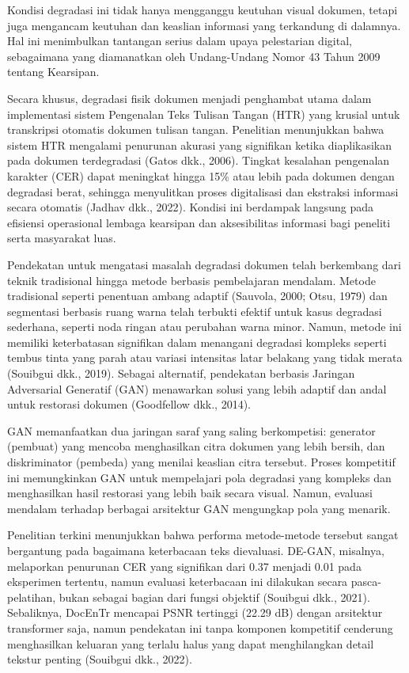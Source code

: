 \documentclass[12pt,a4paper]{book}
\begin{document}
\vspace{0.8em}
Kondisi degradasi ini tidak hanya mengganggu keutuhan visual dokumen, tetapi juga mengancam keutuhan dan keaslian informasi yang terkandung di dalamnya. Hal ini menimbulkan tantangan serius dalam upaya pelestarian digital, sebagaimana yang diamanatkan oleh Undang-Undang Nomor 43 Tahun 2009 tentang Kearsipan.

\vspace{0.8em}
Secara khusus, degradasi fisik dokumen menjadi penghambat utama dalam implementasi sistem Pengenalan Teks Tulisan Tangan (HTR) yang krusial untuk transkripsi otomatis dokumen tulisan tangan. Penelitian menunjukkan bahwa sistem HTR mengalami penurunan akurasi yang signifikan ketika diaplikasikan pada dokumen terdegradasi (Gatos dkk., 2006). Tingkat kesalahan pengenalan karakter (CER) dapat meningkat hingga 15\% atau lebih pada dokumen dengan degradasi berat, sehingga menyulitkan proses digitalisasi dan ekstraksi informasi secara otomatis (Jadhav dkk., 2022). Kondisi ini berdampak langsung pada efisiensi operasional lembaga kearsipan dan aksesibilitas informasi bagi peneliti serta masyarakat luas.

\vspace{0.8em}
Pendekatan untuk mengatasi masalah degradasi dokumen telah berkembang dari teknik tradisional hingga metode berbasis pembelajaran mendalam. Metode tradisional seperti penentuan ambang adaptif (Sauvola, 2000; Otsu, 1979) dan segmentasi berbasis ruang warna telah terbukti efektif untuk kasus degradasi sederhana, seperti noda ringan atau perubahan warna minor. Namun, metode ini memiliki keterbatasan signifikan dalam menangani degradasi kompleks seperti tembus tinta yang parah atau variasi intensitas latar belakang yang tidak merata (Souibgui dkk., 2019). Sebagai alternatif, pendekatan berbasis Jaringan Adversarial Generatif (GAN) menawarkan solusi yang lebih adaptif dan andal untuk restorasi dokumen (Goodfellow dkk., 2014).

\vspace{0.8em}
GAN memanfaatkan dua jaringan saraf yang saling berkompetisi: generator (pembuat) yang mencoba menghasilkan citra dokumen yang lebih bersih, dan diskriminator (pembeda) yang menilai keaslian citra tersebut. Proses kompetitif ini memungkinkan GAN untuk mempelajari pola degradasi yang kompleks dan menghasilkan hasil restorasi yang lebih baik secara visual. Namun, evaluasi mendalam terhadap berbagai arsitektur GAN mengungkap pola yang menarik.

\vspace{0.8em}
Penelitian terkini menunjukkan bahwa performa metode-metode tersebut sangat bergantung pada bagaimana keterbacaan teks dievaluasi. DE-GAN, misalnya, melaporkan penurunan CER yang signifikan dari 0.37 menjadi 0.01 pada eksperimen tertentu, namun evaluasi keterbacaan ini dilakukan secara pasca-pelatihan, bukan sebagai bagian dari fungsi objektif (Souibgui dkk., 2021). Sebaliknya, DocEnTr mencapai PSNR tertinggi (22.29 dB) dengan arsitektur transformer saja, namun pendekatan ini tanpa komponen kompetitif cenderung menghasilkan keluaran yang terlalu halus yang dapat menghilangkan detail tekstur penting (Souibgui dkk., 2022).
\end{document}

